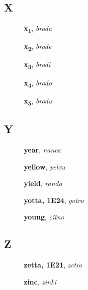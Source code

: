 \documentclass[12pt]{book}
\begin{document}
\subsection{X} %

\begin{description}

\item[ ] \textbf{x\textsubscript{1}}, \textit{broda}

\item[ ] \textbf{x\textsubscript{2}}, \textit{brode}

\item[ ] \textbf{x\textsubscript{3}}, \textit{brodi}

\item[ ] \textbf{x\textsubscript{4}}, \textit{brodo}

\item[ ] \textbf{x\textsubscript{5}}, \textit{brodu}



\end{description}



\subsection{Y} %

\begin{description}

\item[ ] \textbf{year}, \textit{nanca}

\item[ ] \textbf{yellow}, \textit{pelxu}

\item[ ] \textbf{yield}, \textit{randa}

\item[ ] \textbf{yotta, 1E24}, \textit{gotro}

\item[ ] \textbf{young}, \textit{citno}



\end{description}



\subsection{Z} %

\begin{description}

\item[ ] \textbf{zetta, 1E21}, \textit{zetro}

\item[ ] \textbf{zinc}, \textit{zinki}

\end{description}
\end{document}
